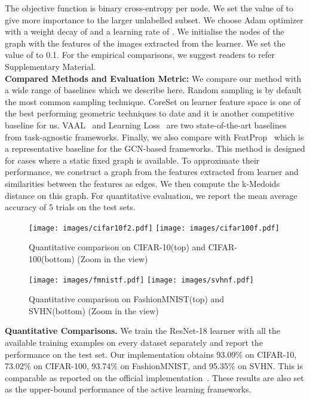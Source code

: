 The objective function is binary cross-entropy per node. 
We set the value of  to give more importance to the larger unlabelled subset. 
We choose Adam \cite{Kingma2015ADAM:Optimization} optimizer with a weight decay of  and 
a learning rate of . We initialise the nodes of the graph with the features of the images extracted from the learner. 
We set the value of  to 0.1. For the empirical comparisons, we suggest readers to refer Supplementary Material.
\\
\noindent \textbf{Compared Methods and Evaluation Metric:} We compare our method with
a wide range of baselines which we describe here. 
Random sampling is by default the most common sampling technique. 
CoreSet\cite{Sener2017ActiveApproach} on learner feature space is one of the
best performing geometric techniques to date and it is another competitive baseline for us. 
VAAL~\cite{Sinha2019VariationalLearning} and Learning Loss~\cite{Yoo2019LearningLearning} 
are two state-of-the-art baselines from task-agnostic frameworks.
Finally, we also compare with FeatProp~\cite{Wu2019ActivePropagation} which 
is a representative baseline for the GCN-based frameworks. This method is designed for cases 
where a static fixed graph is available. To approximate their performance, we construct 
a graph from the features extracted from learner and similarities between the features
as edges. We then compute the k-Medoids distance on this graph.
For quantitative evaluation, we report the mean average accuracy of 
5 trials on the test sets.

\begin{figure}
    \centering
    \texttt{[image: images/cifar10f2.pdf]}
    \texttt{[image: images/cifar100f.pdf]}
    \caption{Quantitative comparison on CIFAR-10(top) and CIFAR-100(bottom) (Zoom in the view)}
    \label{fig:cf10}
\end{figure}
\begin{figure}
    \centering
    \texttt{[image: images/fmnistf.pdf]}
    \texttt{[image: images/svhnf.pdf]}
    \caption{Quantitative comparison on FashionMNIST(top) and SVHN(bottom) (Zoom in the view)}
    \label{fig:fm}
\end{figure}
\noindent \textbf{Quantitative Comparisons.} We train the ResNet-18 learner with all the available training examples on every dataset separately and report the performance on the test set. Our 
implementation obtains 93.09\% on CIFAR-10, 73.02\% on CIFAR-100, 93.74\% on FashionMNIST, 
and  95.35\% on SVHN. This is comparable as reported on the official implementation~\cite{he2016deep}.
These results are also set as the upper-bound performance of the active learning frameworks.


